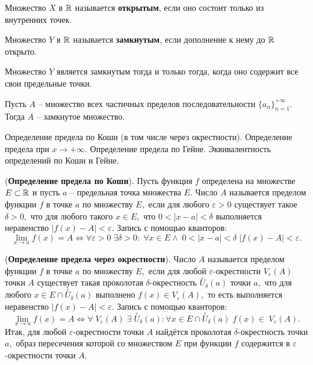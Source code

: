 \begin{definition}
	Множество $X$ в $\mathbb{R}$ называется \textbf{открытым},
	если оно состоит только из внутренних
	точек.

	Множество $Y$ в $\mathbb{R}$ называется \textbf{замкнутым},
	если дополнение к нему до $\mathbb{R}$ открыто.
\end{definition}

\begin{lemma}
	Множество $Y$ является замкнутым тогда
	и только тогда, когда оно содержит
	все свои предельные точки.
\end{lemma}


\begin{lemma}
	Пусть $A$ -- множество всех частичных
	пределов последовательности
	$\{a_n\}_{n=1}^{+\infty}.$ Тогда
	$A$ -- замкнутое множество.
\end{lemma}
\newpage
\begin{problem}
Определение предела по Коши (в том числе через окрестности). Определение предела
при $x \to +\infty$. Определение предела по Гейне. Эквивалентность определений по Коши и
Гейне.
\end{problem}

\begin{definition}
	(\textbf{Определение предела по Коши}).
	Пусть функция $f$ определена на множестве
	$E\subset\mathbb{R}$ и пусть $a$ -- предельная
	точка множества $E.$ Число $A$ называется
	пределом функции $f$ в точке $a$ по множеству
	$E,$ если для любого $\varepsilon>0$
	существует такое $\delta>0,$ что
	для любого такого $x\in E,$ что
	$0<|x-a|<\delta$
	выполняется неравенство $|f(x)-A|<\varepsilon.$
	Запись с помощью кванторов:
	$$
		\lim\limits_{x\rightarrow a}f(x)=A\Leftrightarrow
		\forall\varepsilon>0\;\exists\delta>0:\;
		\forall x \in E\wedge\;0<|x-a|<\delta\;
		|f(x)-A|<\varepsilon.
	$$
\end{definition}

\begin{definition} (\textbf{Определение предела через окрестности}).
	Число $A$
	называется пределом функции $f$
	в точке $a$ по множеству $E,$ если
	для любой $\varepsilon$-окрестности
	$V_{\varepsilon}(A)$ точки $A$ существует
	такая проколотая $\delta$-окрестность
	$\stackrel{\circ}{U}_{\delta}(a)$ точки $a,$
	что для любого $x \in E\cap
		\stackrel{\circ}{U}_{\delta}(a)$ выполнено
	$f(x)\in V_{\varepsilon}(A),$ то есть
	выполняется неравенство $|f(x)-A|<\varepsilon.$
	Запись с помощью кванторов:
	$$
		\lim
		\limits_{x\rightarrow a}f(x)=A\Leftrightarrow
		\forall\;V_{\varepsilon}(A)\;\exists\;
		\stackrel{\circ}{U}_{\delta}(a):
		\forall x \in E\cap\stackrel{\circ}{U}_{\delta}(a)\;
		f(x)\in\;V_{\varepsilon}(A).
	$$
	Итак, для любой $\varepsilon$-окрестности точки $A$
	найдётся проколотая $\delta$-окрестность точки
	$a,$ образ пересечения которой со множеством
	$E$ при функции $f$ содержится в
	$\varepsilon$-окрестности точки $A.$
\end{definition}

